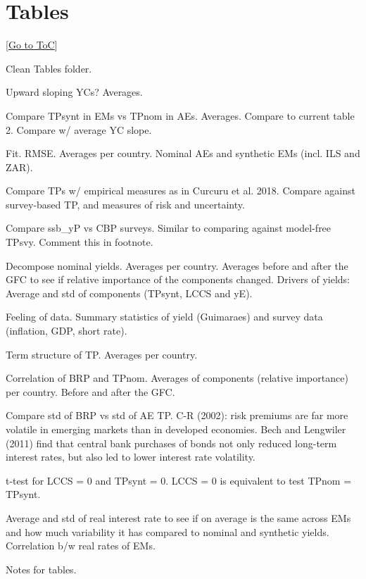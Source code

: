 \documentclass[12pt]{article}
\newcommand{\gototoc}{\vspace{-1.8cm} \null\hfill [\hyperlink{toc}{Go to ToC}] \newline}
\begin{document}
\section{Tables}
\gototoc
\begin{todolist}
	\item Clean Tables folder.
	\item Upward sloping YCs? Averages.
	\item Compare TPsynt in EMs vs TPnom in AEs. Averages. Compare to current table 2. Compare w/ average YC slope. 
	\item Fit. RMSE. Averages per country. Nominal AEs and synthetic EMs (incl. ILS and ZAR).
	\item Compare TPs w/ empirical measures as in Curcuru et al. 2018. Compare against survey-based TP, and measures of risk and uncertainty.
	\item Compare ssb_yP vs CBP surveys. Similar to comparing against model-free TPsvy. Comment this in footnote.
	\item Decompose nominal yields. Averages per country. Averages before and after the GFC to see if relative importance of the components changed. Drivers of yields: Average and std of components (TPsynt, LCCS and yE).
	\item Feeling of data. Summary statistics of yield (Guimaraes) and survey data (inflation, GDP, short rate). 
	\item Term structure of TP. Averages per country.
	\item Correlation of BRP and TPnom. Averages of components (relative importance) per country. Before and after the GFC.
	\item Compare std of BRP vs std of AE TP. C-R (2002): risk premiums are far more volatile in emerging markets than in developed economies. Bech and Lengwiler (2011) find that central bank purchases of bonds not only reduced long-term interest rates, but also led to lower interest rate volatility. 
	\item t-test for LCCS = 0 and TPsynt = 0. LCCS = 0 is equivalent to test TPnom = TPsynt.
	\item Average and std of real interest rate to see if on average is the same across EMs and how much variability it has compared to nominal and synthetic yields. Correlation b/w real rates of EMs.
	\item Notes for tables.
\end{todolist}
\end{document}
